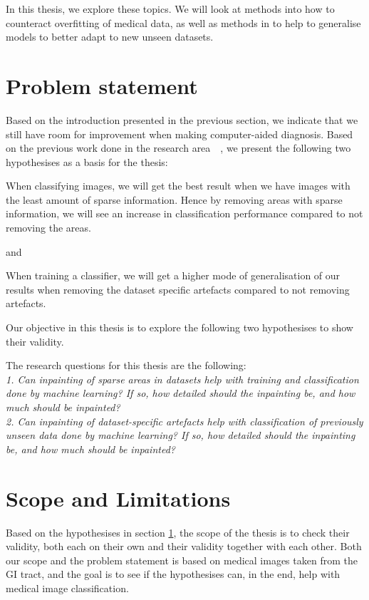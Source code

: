 In this thesis, we explore these topics. We will look at methods into how to counteract overfitting of medical data, as well as methods in to help to generalise models to better adapt to new unseen datasets.

\clearpage
\section{Problem statement}
\label{cha:problemstatement}
Based on the introduction presented in the previous section, we indicate that we still have room for improvement when making computer-aided diagnosis. Based on the previous work done in the research area~\cite{25956}~\cite{25953}, we present the following two hypothesises as a basis for the thesis:


\noindent
\begin{hyp} \label{hyp:a}
When classifying images, we will get the best result when we have images with the least amount of sparse information. 
Hence by removing areas with sparse information,
we will see an increase in classification performance compared to not removing the areas.
\end{hyp}

\noindent
and

\noindent 
\begin{hyp} \label{hyp:b}
When training a classifier, we will get a higher
mode of generalisation of our results when removing the dataset
specific artefacts compared to not removing artefacts.
\end{hyp}
\vspace{5px}


Our objective in this thesis is to explore the following two hypothesises to show their validity.

The research questions for this thesis are the following:\\

\textit{1. Can inpainting of sparse areas in datasets help with training and classification done by machine learning? If so, how detailed should the inpainting be, and how much should be inpainted?}\\

\textit{2. Can inpainting of dataset-specific artefacts help with classification of previously unseen data done by machine learning? If so, how detailed should the inpainting be, and how much should be inpainted?}

\section{Scope and Limitations}
Based on the hypothesises in section \ref{cha:problemstatement}, the scope of the thesis is to check their validity, both each on their own and their validity together with each other. 
Both our scope and the problem statement is based on medical images taken from the GI tract, and the goal is to see if the hypothesises can, in the end, help with medical image classification.


